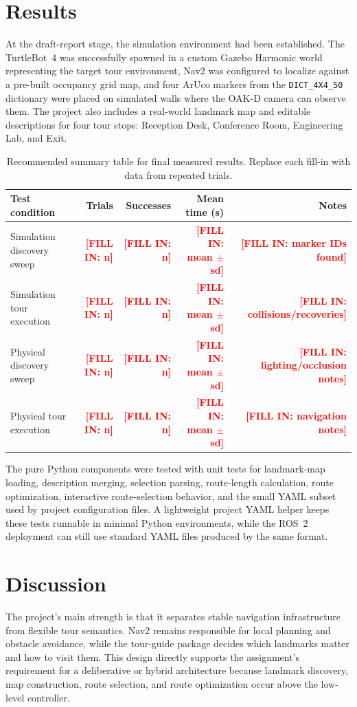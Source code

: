 \documentclass[12pt]{article}
\newcommand{\fillin}[1]{\textcolor{red}{\textbf{[FILL IN: #1]}}}
\begin{document}
\section*{Results}
At the draft-report stage, the simulation environment had been established. The TurtleBot~4 was successfully spawned in a custom Gazebo Harmonic world representing the target tour environment, Nav2 was configured to localize against a pre-built occupancy grid map, and four ArUco markers from the \texttt{DICT\_4X4\_50} dictionary were placed on simulated walls where the OAK-D camera can observe them. The project also includes a real-world landmark map and editable descriptions for four tour stops: Reception Desk, Conference Room, Engineering Lab, and Exit.

\begin{table}[h]
\centering
\begin{tabular}{lrrrr}
\toprule
Test condition & Trials & Successes & Mean time (s) & Notes \\
\midrule
Simulation discovery sweep & \fillin{n} & \fillin{n} & \fillin{mean $\pm$ sd} & \fillin{marker IDs found} \\
Simulation tour execution & \fillin{n} & \fillin{n} & \fillin{mean $\pm$ sd} & \fillin{collisions/recoveries} \\
Physical discovery sweep & \fillin{n} & \fillin{n} & \fillin{mean $\pm$ sd} & \fillin{lighting/occlusion notes} \\
Physical tour execution & \fillin{n} & \fillin{n} & \fillin{mean $\pm$ sd} & \fillin{navigation notes} \\
\bottomrule
\end{tabular}
\caption{Recommended summary table for final measured results. Replace each fill-in with data from repeated trials.}
\end{table}

The pure Python components were tested with unit tests for landmark-map loading, description merging, selection parsing, route-length calculation, route optimization, interactive route-selection behavior, and the small YAML subset used by project configuration files. A lightweight project YAML helper keeps these tests runnable in minimal Python environments, while the ROS~2 deployment can still use standard YAML files produced by the same format.

\section*{Discussion}
The project's main strength is that it separates stable navigation infrastructure from flexible tour semantics. Nav2 remains responsible for local planning and obstacle avoidance, while the tour-guide package decides which landmarks matter and how to visit them. This design directly supports the assignment's requirement for a deliberative or hybrid architecture because landmark discovery, map construction, route selection, and route optimization occur above the low-level controller.
\end{document}
